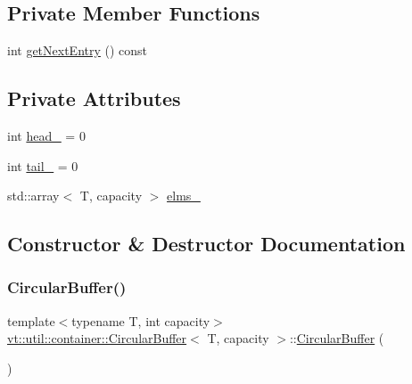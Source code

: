 \subsection*{Private Member Functions}
\begin{DoxyCompactItemize}
\item 
int \hyperlink{structvt_1_1util_1_1container_1_1_circular_buffer_aa5c6301f521d2e1b1331e6adb9573890}{get\+Next\+Entry} () const
\end{DoxyCompactItemize}
\subsection*{Private Attributes}
\begin{DoxyCompactItemize}
\item 
int \hyperlink{structvt_1_1util_1_1container_1_1_circular_buffer_a543bede3221fb2df06bd856bc4a45f21}{head\+\_\+} = 0
\item 
int \hyperlink{structvt_1_1util_1_1container_1_1_circular_buffer_a5eb4acef245cc1a7a455a9ef99f1f4b4}{tail\+\_\+} = 0
\item 
std\+::array$<$ T, capacity $>$ \hyperlink{structvt_1_1util_1_1container_1_1_circular_buffer_a9c05e2d6d78d7db1a57ff24a00f928e0}{elms\+\_\+}
\end{DoxyCompactItemize}


\subsection{Constructor \& Destructor Documentation}
\mbox{\label{structvt_1_1util_1_1container_1_1_circular_buffer_a38cfb7731cba8b9276711b18ddedf4e8}} 
\subsubsection{\texorpdfstring{Circular\+Buffer()}{CircularBuffer()}}
{\footnotesize\ttfamily template$<$typename T, int capacity$>$ \\
\hyperlink{structvt_1_1util_1_1container_1_1_circular_buffer}{vt\+::util\+::container\+::\+Circular\+Buffer}$<$ T, capacity $>$\+::\hyperlink{structvt_1_1util_1_1container_1_1_circular_buffer}{Circular\+Buffer} (\begin{DoxyParamCaption}{ }\end{DoxyParamCaption})\hspace{0.3cm}{\ttfamily [default]}}



